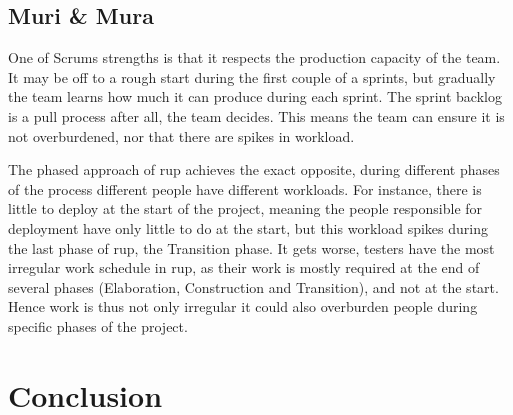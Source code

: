 \subsection{Muri \& Mura}
One of Scrums strengths is that it respects the production capacity of the team. It may be off to a rough start during the first couple of a sprints, but gradually the team learns how much it can produce during each sprint. The sprint backlog is a pull process after all, the team decides. This means the team can ensure it is not overburdened, nor that there are spikes in workload. 

The phased approach of \ac{rup} achieves the exact opposite, during different phases of the process different people have different workloads. For instance, there is little to deploy at the start of the project, meaning the people responsible for deployment have only little to do at the start, but this workload spikes during the last phase of \ac{rup}, the Transition phase. It gets worse, testers have the most irregular work schedule in \ac{rup}, as their work is mostly required at the end of several phases (Elaboration, Construction and Transition), and not at the start. Hence work is thus not only irregular it could also overburden people during specific phases of the project.

\section{Conclusion}